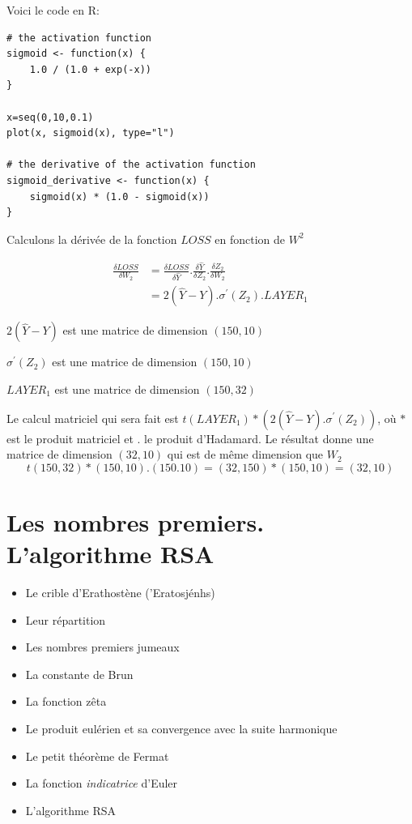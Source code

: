 \documentclass[11pt]{book}
\begin{document}
Voici le code en R:

\begin{Verbatim}
# the activation function
sigmoid <- function(x) {
	1.0 / (1.0 + exp(-x))
}

x=seq(0,10,0.1)
plot(x, sigmoid(x), type="l") 

# the derivative of the activation function
sigmoid_derivative <- function(x) {
	sigmoid(x) * (1.0 - sigmoid(x))
}
\end{Verbatim}


Calculons la dérivée de la fonction $LOSS$ en fonction de $W^2$ 

\begin{align}
\frac{\delta LOSS}{\delta W_2} & =\frac{\delta LOSS}{\delta \hat{Y}} . \frac{\delta \hat{Y}}{\delta Z_2}. \frac{\delta Z_2}{\delta W_2 } \\
 &= 2(\hat{Y}-Y) . \sigma ^\prime (Z_2) . LAYER_1 
\end{align}

$2(\hat{Y}-Y)$ est une matrice de dimension $(150, 10)$

$\sigma ^\prime (Z_2)$ est une matrice de dimension $(150,10)$

$LAYER_1$ est une matrice de dimension $(150,32)$

Le calcul matriciel qui sera fait est $t(LAYER_1)* (2(\hat{Y}-Y) . \sigma ^\prime (Z_2))$, où $*$ est le produit matriciel et $.$ le produit d'Hadamard.
Le résultat donne une matrice de dimension $(32,10)$ qui est de même dimension que $W_2$
$$
t(150,32) * (150,10).(150.10) = (32,150)*(150,10)=(32,10)
$$


\section{Les nombres premiers. L'algorithme RSA}

\begin{itemize}
	\item Le crible d'Erathostène (\textgreek{'Eratosjénhs}) 
	\item Leur répartition
	\item Les nombres premiers jumeaux
	\item La constante de Brun 
	\item La fonction zêta
	\item Le produit eulérien et sa convergence avec la suite harmonique
	\item Le petit théorème de Fermat
	\item La fonction \textit{indicatrice} d'Euler
	\item L'algorithme RSA
\end{itemize}
\end{document}
